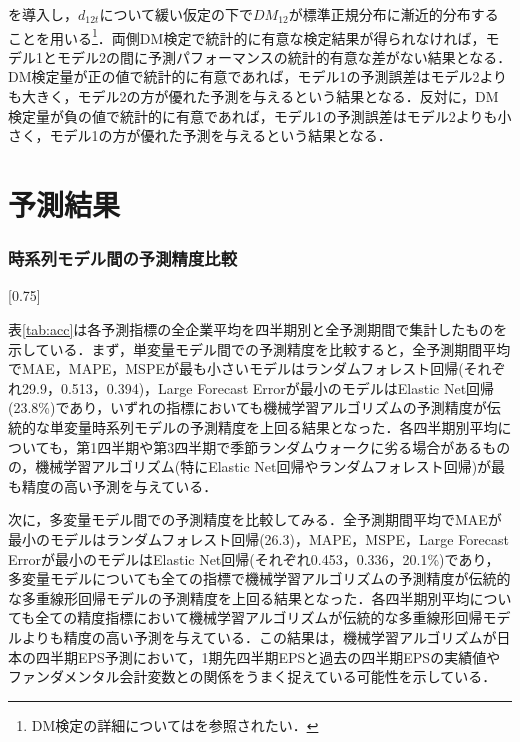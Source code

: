 \documentclass[a4paper，12pt]{jsarticle}
\begin{document}
\noindent
を導入し，$d_{12t}$について緩い仮定の下で$DM_{12}$が標準正規分布に漸近的分布することを用いる\footnote{DM検定の詳細については\cite{diebold2002comparing}を参照されたい．}．両側DM検定で統計的に有意な検定結果が得られなければ，モデル1とモデル2の間に予測パフォーマンスの統計的有意な差がない結果となる．DM検定量が正の値で統計的に有意であれば，モデル1の予測誤差はモデル2よりも大きく，モデル2の方が優れた予測を与えるという結果となる．反対に，DM検定量が負の値で統計的に有意であれば，モデル1の予測誤差はモデル2よりも小さく，モデル1の方が優れた予測を与えるという結果となる．

\part{予測結果} \label{par:result}

\section{時系列モデル間の予測精度比較}

\begin{landscape}
\begin{table}
  \caption{時系列モデルによる1期先四半期EPS予測の精度(1,003社平均)}
  \label{tab:acc}
  \scalebox{0.75}[0.75]{
    
  }
\end{table}
\end{landscape}

表\ref{tab:acc}は各予測指標の全企業平均を四半期別と全予測期間で集計したものを示している．まず，単変量モデル間での予測精度を比較すると，全予測期間平均でMAE，MAPE，MSPEが最も小さいモデルはランダムフォレスト回帰(それぞれ29.9，0.513，0.394)，Large Forecast Errorが最小のモデルはElastic Net回帰(23.8\%)であり，いずれの指標においても機械学習アルゴリズムの予測精度が伝統的な単変量時系列モデルの予測精度を上回る結果となった．各四半期別平均についても，第1四半期や第3四半期で季節ランダムウォークに劣る場合があるものの，機械学習アルゴリズム(特にElastic Net回帰やランダムフォレスト回帰)が最も精度の高い予測を与えている．

次に，多変量モデル間での予測精度を比較してみる．全予測期間平均でMAEが最小のモデルはランダムフォレスト回帰(26.3)，MAPE，MSPE，Large Forecast Errorが最小のモデルはElastic Net回帰(それぞれ0.453，0.336，20.1\%)であり，多変量モデルについても全ての指標で機械学習アルゴリズムの予測精度が伝統的な多重線形回帰モデルの予測精度を上回る結果となった．各四半期別平均についても全ての精度指標において機械学習アルゴリズムが伝統的な多重線形回帰モデルよりも精度の高い予測を与えている．この結果は，機械学習アルゴリズムが日本の四半期EPS予測において，1期先四半期EPSと過去の四半期EPSの実績値やファンダメンタル会計変数との関係をうまく捉えている可能性を示している．
\end{document}
